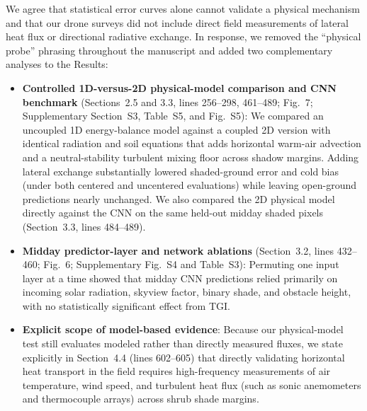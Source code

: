 \documentclass[12pt,english]{reviewresponse}
\begin{document}
\begin{revresponse}
We agree that statistical error curves alone cannot validate a physical mechanism and that our drone surveys did not include direct field measurements of lateral heat flux or directional radiative exchange. In response, we removed the ``physical probe'' phrasing throughout the manuscript and added two complementary analyses to the Results:
\begin{itemize}[leftmargin=*, itemsep=0.2em]
    \item \textbf{Controlled 1D-versus-2D physical-model comparison and CNN benchmark} (Sections~2.5 and 3.3, lines 256--298, 461--489; Fig.~7; Supplementary Section~S3, Table~S5, and Fig.~S5): We compared an uncoupled 1D energy-balance model against a coupled 2D version with identical radiation and soil equations that adds horizontal warm-air advection and a neutral-stability turbulent mixing floor across shadow margins. Adding lateral exchange substantially lowered shaded-ground error and cold bias (under both centered and uncentered evaluations) while leaving open-ground predictions nearly unchanged. We also compared the 2D physical model directly against the CNN on the same held-out midday shaded pixels (Section~3.3, lines 484--489).
    \item \textbf{Midday predictor-layer and network ablations} (Section~3.2, lines 432--460; Fig.~6; Supplementary Fig.~S4 and Table~S3): Permuting one input layer at a time showed that midday CNN predictions relied primarily on incoming solar radiation, skyview factor, binary shade, and obstacle height, with no statistically significant effect from TGI.
    \item \textbf{Explicit scope of model-based evidence}: Because our physical-model test still evaluates modeled rather than directly measured fluxes, we state explicitly in Section~4.4 (lines 602--605) that directly validating horizontal heat transport in the field requires high-frequency measurements of air temperature, wind speed, and turbulent heat flux (such as sonic anemometers and thermocouple arrays) across shrub shade margins.
\end{itemize}
\end{revresponse}
\end{document}
